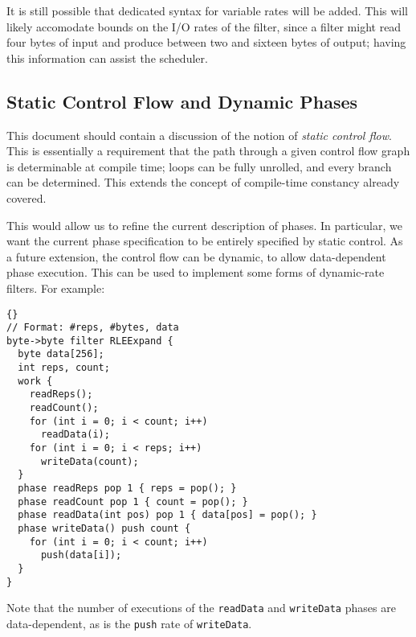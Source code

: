 It is still possible that dedicated syntax for variable rates will be
added.  This will likely accomodate bounds on the I/O rates of the
filter, since a filter might read four bytes of input and produce
between two and sixteen bytes of output; having this information can
assist the scheduler.

\subsection{Static Control Flow and Dynamic Phases}

This document should contain a discussion of the notion of
\emph{static control flow}.  This is essentially a requirement that
the path through a given control flow graph is determinable at compile
time; loops can be fully unrolled, and every branch can be
determined.  This extends the concept of compile-time constancy
already covered.

This would allow us to refine the current description of phases.  In
particular, we want the current phase specification to be entirely
specified by static control.  As a future extension, the control flow
can be dynamic, to allow data-dependent phase execution.  This can be
used to implement some forms of dynamic-rate filters.  For example:

\begin{lstlisting}{}
// Format: #reps, #bytes, data
byte->byte filter RLEExpand {
  byte data[256];
  int reps, count;
  work {
    readReps();
    readCount();
    for (int i = 0; i < count; i++)
      readData(i);
    for (int i = 0; i < reps; i++)
      writeData(count);
  }
  phase readReps pop 1 { reps = pop(); }
  phase readCount pop 1 { count = pop(); }
  phase readData(int pos) pop 1 { data[pos] = pop(); }
  phase writeData() push count {
    for (int i = 0; i < count; i++)
      push(data[i]);
  }
}
\end{lstlisting}

Note that the number of executions of the \lstinline|readData| and
\lstinline|writeData| phases are data-dependent, as is the
\lstinline|push| rate of \lstinline|writeData|.